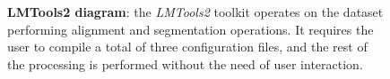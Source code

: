 \begin{figure}[htbp]
	\centering
	\caption[LMTools2 diagram]{\textbf{LMTools2 diagram}: the \emph{LMTools2}
	toolkit operates on the dataset performing alignment and segmentation
	operations. It requires the user to compile a total of three configuration
	files, and the rest of the processing is performed without the need of user
	interaction. 
	\label{fig:results:blackbox}
}
\end{figure}
